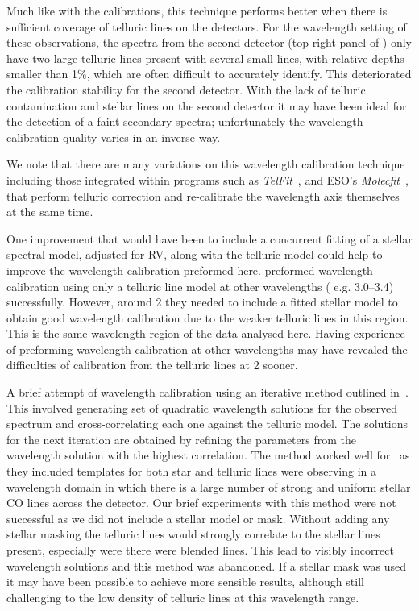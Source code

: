 
Much like with the \thar{} calibrations, this technique performs better when there is sufficient coverage of telluric lines on the detectors. For the wavelength setting of these observations, the spectra from the second detector (top right panel of ) only have two large telluric lines present with several small lines, with relative depths smaller than 1\%, which are often difficult to accurately identify. This deteriorated the calibration stability for the second detector. With the lack of telluric contamination and stellar lines on the second detector it may have been ideal for the detection of a faint secondary spectra; unfortunately the wavelength calibration quality varies in an inverse way.


We note that there are many variations on this wavelength calibration technique including those integrated within programs such as \emph{TelFit}~\citet{gullikson_correcting_2014}, and ESO's \emph{Molecfit}~\citet{smette_molecfit_2015}, that perform telluric correction and re-calibrate the wavelength axis themselves at the same time.

One improvement that would have been to include a concurrent fitting of a stellar spectral model, adjusted for RV, along with the telluric model could help to improve the wavelength calibration preformed here. \citet{piskorz_evidence_2016} preformed wavelength calibration using only a telluric line model at other \nir{} wavelengths {\red{}( e.g. 3.0--3.4\um{})} successfully. However, around 2\um{} they needed to include a fitted stellar model to obtain good wavelength calibration due to the weaker telluric lines in this region. This is the same wavelength region of the data analysed here. Having experience of preforming wavelength calibration at other wavelengths may have revealed the difficulties of calibration from the telluric lines at 2\um{} sooner.

A brief attempt of wavelength calibration using an iterative method outlined in~\cite{brogi_rotation_2016}. This involved generating set of quadratic wavelength solutions for the observed spectrum and cross-correlating each one against the telluric model. The solutions for the next iteration are obtained by refining the parameters from the wavelength solution with the highest correlation. The method worked well for~\citet{brogi_rotation_2016} as they included templates for both star and telluric lines were observing in a wavelength domain in which there is a large number of strong and uniform stellar CO lines across the detector.
Our brief experiments with this method were not successful as we did not include a stellar model or mask. Without adding any stellar masking the telluric lines would strongly correlate to the stellar lines present, especially were there were blended lines. This lead to visibly incorrect wavelength solutions and this method was abandoned. If a stellar mask was used it may have been possible to achieve more sensible results, although still challenging to the low density of telluric lines at this wavelength range.



